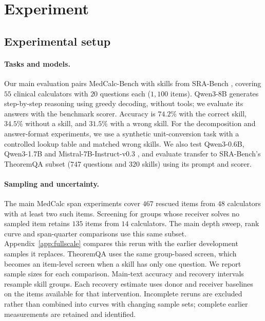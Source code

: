 \documentclass{article}
\begin{document}
\section{Experiment}
\label{sec:experiments}

\subsection{Experimental setup}
\label{sec:setup}
\label{sec:cells}

\paragraph{Tasks and models.}
Our main evaluation pairs MedCalc-Bench \citep{khandekar2024medcalc} with
skills from SRA-Bench \citep{su2026srabench}, covering $55$ clinical calculators
with $20$ questions each ($1{,}100$ items). Qwen3-8B \citep{yang2025qwen3}
generates step-by-step reasoning using greedy decoding, without tools; we
evaluate its answers with the benchmark scorer. Accuracy is $74.2\%$ with the
correct skill, $34.5\%$ without a skill, and $31.5\%$ with a wrong skill.
For the decomposition and answer-format experiments, we use a synthetic
unit-conversion task with a controlled lookup table and matched wrong skills.
We also test Qwen3-0.6B, Qwen3-1.7B and Mistral-7B-Instruct-v0.3
\citep{jiang2023mistral}, and evaluate transfer to SRA-Bench's TheoremQA subset
($747$ questions and $320$ skills) using its prompt and scorer.

\paragraph{Sampling and uncertainty.}
The main MedCalc span experiments cover $467$ rescued items from $48$
calculators with at least two such items. Screening for groups whose receiver
solves no sampled item retains $135$ items from $14$ calculators. The main
depth sweep, rank curve and span-quarter comparisons use this same subset.
Appendix~\ref{app:fullscale} compares this rerun with the earlier development
samples it replaces. TheoremQA uses the same
group-based screen, which becomes an item-level screen when a skill has only
one question. We report sample sizes for each comparison. Main-text accuracy
and recovery intervals resample skill groups. Each recovery estimate uses
donor and receiver baselines on the items available for that intervention.
Incomplete reruns are excluded rather than combined into curves with changing
sample sets; complete earlier measurements are retained and identified.
\end{document}
